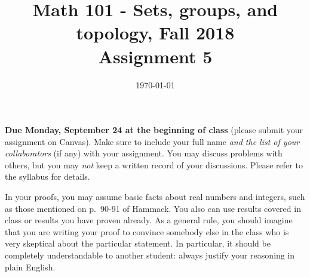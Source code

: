 \documentclass{amsart}
\title[Math 101, Fall 2018: assignment 5]{Math 101 - Sets, groups, and topology, Fall 2018 \\ Assignment 5}
\date{\today}
\theoremstyle{definition}
\begin{document}

\maketitle

\textbf{Due Monday, September 24 at the beginning of class} (please submit your assignment on Canvas). Make sure to include your full name \emph{and the list of your collaborators} (if any) with your assignment. You may discuss problems with others, but you may \emph{not} keep a written record of your discussions. Please refer to the syllabus for details.

In your proofs, you may assume basic facts about real numbers and integers, such as those mentioned on p.~90-91 of Hammack. You also can use results covered in class or results you have proven already. As a general rule, you should imagine that you are writing your proof to convince somebody else in the class who is very skeptical about the particular statement. In particular, it should be completely understandable to another student: always justify your reasoning in plain English. 
\end{document}
